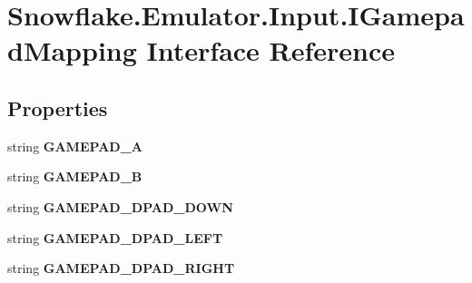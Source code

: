 \hypertarget{interface_snowflake_1_1_emulator_1_1_input_1_1_i_gamepad_mapping}{}\section{Snowflake.\+Emulator.\+Input.\+I\+Gamepad\+Mapping Interface Reference}
\label{interface_snowflake_1_1_emulator_1_1_input_1_1_i_gamepad_mapping}
\subsection*{Properties}
\begin{DoxyCompactItemize}
\item 
\hypertarget{interface_snowflake_1_1_emulator_1_1_input_1_1_i_gamepad_mapping_af59588b20b95d350a75333a38574e3f3}{}string {\bfseries G\+A\+M\+E\+P\+A\+D\+\_\+\+A}\label{interface_snowflake_1_1_emulator_1_1_input_1_1_i_gamepad_mapping_af59588b20b95d350a75333a38574e3f3}

\item 
\hypertarget{interface_snowflake_1_1_emulator_1_1_input_1_1_i_gamepad_mapping_a9bed1e2f3e80c3bc43888fc7b0107483}{}string {\bfseries G\+A\+M\+E\+P\+A\+D\+\_\+\+B}\label{interface_snowflake_1_1_emulator_1_1_input_1_1_i_gamepad_mapping_a9bed1e2f3e80c3bc43888fc7b0107483}

\item 
\hypertarget{interface_snowflake_1_1_emulator_1_1_input_1_1_i_gamepad_mapping_a8021f81f230312a13fb1de108c5ad252}{}string {\bfseries G\+A\+M\+E\+P\+A\+D\+\_\+\+D\+P\+A\+D\+\_\+\+D\+O\+W\+N}\label{interface_snowflake_1_1_emulator_1_1_input_1_1_i_gamepad_mapping_a8021f81f230312a13fb1de108c5ad252}

\item 
\hypertarget{interface_snowflake_1_1_emulator_1_1_input_1_1_i_gamepad_mapping_a9e07f64a2ddb30be0994d36b9c44526d}{}string {\bfseries G\+A\+M\+E\+P\+A\+D\+\_\+\+D\+P\+A\+D\+\_\+\+L\+E\+F\+T}\label{interface_snowflake_1_1_emulator_1_1_input_1_1_i_gamepad_mapping_a9e07f64a2ddb30be0994d36b9c44526d}

\item 
\hypertarget{interface_snowflake_1_1_emulator_1_1_input_1_1_i_gamepad_mapping_a967dd3c71e7a43aa1b8cd4af2fe45c9d}{}string {\bfseries G\+A\+M\+E\+P\+A\+D\+\_\+\+D\+P\+A\+D\+\_\+\+R\+I\+G\+H\+T}\label{interface_snowflake_1_1_emulator_1_1_input_1_1_i_gamepad_mapping_a967dd3c71e7a43aa1b8cd4af2fe45c9d}


\end{DoxyCompactItemize}
